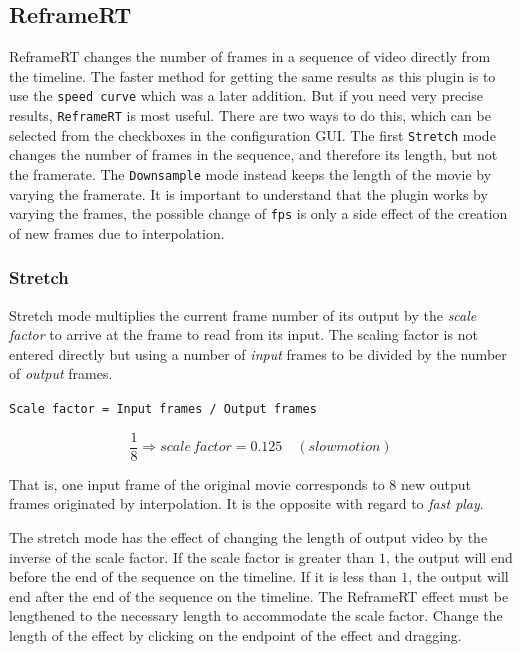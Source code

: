 \subsection{ReframeRT}%
\label{sub:reframert}

ReframeRT changes the number of frames in a sequence of video directly from the timeline. The faster method for getting the same results as this plugin is to use the \texttt{speed curve} which was a later addition. But if you need very precise results, \texttt{ReframeRT} is most useful. There are two ways to do this, which can be selected from the checkboxes in the configuration GUI. The first \texttt{Stretch} mode changes the number of frames in the sequence, and therefore its length, but not the framerate. The \texttt{Downsample} mode instead keeps the length of the movie by varying the framerate.
It is important to understand that the plugin works by varying the frames, the possible change of \texttt{fps} is only a side effect of the creation of new frames due to interpolation.

\subsubsection*{Stretch}%
\label{ssub:stretch}

Stretch mode multiplies the current frame number of its output by the \textit{scale factor} to arrive at the frame to read from its input. The scaling factor is not entered directly but using a number of \textit{input} frames to be divided by the number of \textit{output} frames.

\vspace{1ex} \texttt{Scale factor = Input frames / Output frames}

\[\frac{1}{8} \Rightarrow scale\, factor = 0.125 \quad (slowmotion)\]

That is, one input frame of the original movie corresponds to $8$ new output frames originated by interpolation. It is the opposite with regard to \textit{fast play}.

The stretch mode has the effect of changing the length of output video by the inverse of the scale factor. If the scale factor is greater than $1$, the output will end before the end of the sequence on the timeline. If it is less than $1$, the output will end after the end of the sequence on the timeline. The ReframeRT effect must be lengthened to the necessary length to accommodate the scale factor. Change the length of the effect by clicking on the endpoint of the effect and dragging.

